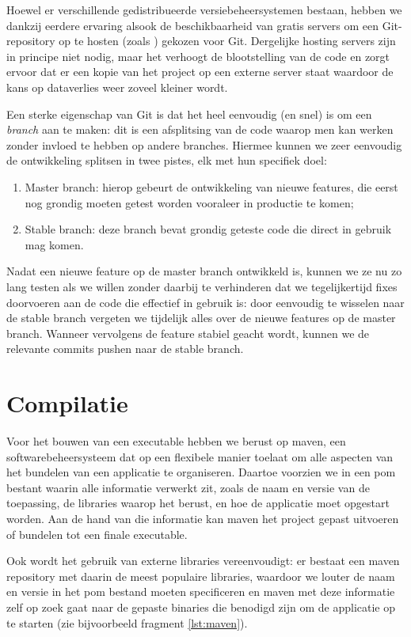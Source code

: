 Hoewel er verschillende gedistribueerde versiebeheersystemen bestaan, hebben we dankzij eerdere ervaring alsook de beschikbaarheid van gratis servers om een Git-repository op te hosten (zoals ) gekozen voor Git. Dergelijke hosting servers zijn in principe niet nodig, maar het verhoogt de blootstelling van de code en zorgt ervoor dat er een kopie van het project op een externe server staat waardoor de kans op dataverlies weer zoveel kleiner wordt.

Een sterke eigenschap van Git is dat het heel eenvoudig (en snel) is om een \emph{branch} aan te maken: dit is een afsplitsing van de code waarop men kan werken zonder invloed te hebben op andere branches. Hiermee kunnen we zeer eenvoudig de ontwikkeling splitsen in twee pistes, elk met hun specifiek doel:
\begin{enumerate}
  \item Master branch: hierop gebeurt de ontwikkeling van nieuwe features, die eerst nog grondig moeten getest worden vooraleer in productie te komen;
  \item Stable branch: deze branch bevat grondig geteste code die direct in gebruik mag komen.
\end{enumerate}
Nadat een nieuwe feature op de master branch ontwikkeld is, kunnen we ze nu zo lang testen als we willen zonder daarbij te verhinderen dat we tegelijkertijd fixes doorvoeren aan de code die effectief in gebruik is: door eenvoudig te wisselen naar de stable branch vergeten we tijdelijk alles over de nieuwe features op de master branch. Wanneer vervolgens de feature stabiel geacht wordt, kunnen we de relevante commits pushen naar de stable branch.

\section{Compilatie}

Voor het bouwen van een executable hebben we berust op \ac{maven}, een softwarebeheersysteem dat op een flexibele manier toelaat om alle aspecten van het bundelen van een applicatie te organiseren. Daartoe voorzien we in een \ac{pom} bestant waarin alle informatie verwerkt zit, zoals de naam en versie van de toepassing, de libraries waarop het berust, en hoe de applicatie moet opgestart worden. Aan de hand van die informatie kan \ac{maven} het project gepast uitvoeren of bundelen tot een finale executable.

Ook wordt het gebruik van externe libraries vereenvoudigt: er bestaat een \ac{maven} repository met daarin de meest populaire libraries, waardoor we louter de naam en versie in het \ac{pom} bestand moeten specificeren en \ac{maven} met deze informatie zelf op zoek gaat naar de gepaste binaries die benodigd zijn om de applicatie op te starten (zie bijvoorbeeld fragment \ref{lst:maven}).

